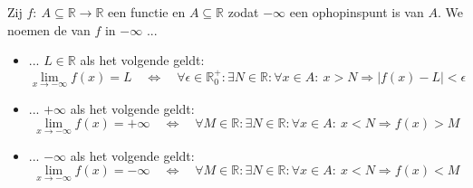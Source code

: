 \documentclass[main.tex]{subfiles}
\begin{document}
\begin{de}
  Zij $f:\ A \subseteq \mathbb{R} \rightarrow \mathbb{R}$ een functie en $A \subseteq \mathbb{R}$ zodat $-\infty$ een ophopinspunt is van $A$.
  We noemen de  van $f$ in $-\infty$ ...
  \begin{itemize}
  \item ... $L\in \mathbb{R}$ als het volgende geldt:
    \[
    \lim_{x\rightarrow -\infty}f(x) = L \quad\Leftrightarrow\quad
    \forall \epsilon \in \mathbb{R}_{0}^{+}: \exists N \in \mathbb{R}: \forall x\in A:\ x > N \Rightarrow |f(x) - L| < \epsilon
    \]
  \item ... $+\infty$ als het volgende geldt:
    \[
    \lim_{x\rightarrow -\infty}f(x) = +\infty\quad\Leftrightarrow\quad
    \forall M \in \mathbb{R}: \exists N \in \mathbb{R}: \forall x\in A:\ x < N \Rightarrow f(x) > M
    \]
  \item ... $-\infty$ als het volgende geldt:
    \[
    \lim_{x\rightarrow -\infty}f(x) = -\infty\quad\Leftrightarrow\quad
    \forall M \in \mathbb{R}: \exists N \in \mathbb{R}: \forall x\in A:\ x < N \Rightarrow f(x) < M
    \]
  \end{itemize}
\end{de}
\end{document}
